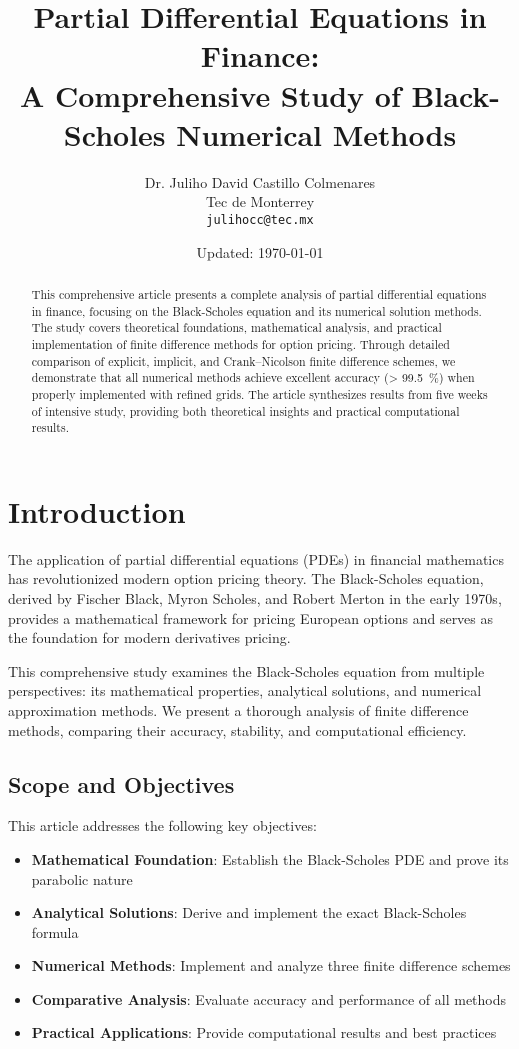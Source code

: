 \documentclass[12pt,a4paper]{article}
\title{\textbf{Partial Differential Equations in Finance: \\
A Comprehensive Study of Black-Scholes Numerical Methods}}
\author{Dr. Juliho David Castillo Colmenares \\ Tec de Monterrey \\ \texttt{julihocc@tec.mx}}
\date{Updated: \today}
\numberwithin{algorithm}{subsection}
\begin{document}
\maketitle

\begin{abstract}
This comprehensive article presents a complete analysis of partial differential equations in finance, focusing on the Black-Scholes equation and its numerical solution methods. The study covers theoretical foundations, mathematical analysis, and practical implementation of finite difference methods for option pricing. Through detailed comparison of explicit, implicit, and Crank–Nicolson finite difference schemes, we demonstrate that all numerical methods achieve excellent accuracy (> \SI{99.5}{\percent}) when properly implemented with refined grids. The article synthesizes results from five weeks of intensive study, providing both theoretical insights and practical computational results.
\end{abstract}

\tableofcontents
\listoffigures
\newpage
\listoftables
\newpage

\section{Introduction}
\label{sec:introduction}

The application of partial differential equations (PDEs) in financial mathematics has revolutionized modern option pricing theory. The Black-Scholes equation, derived by Fischer Black, Myron Scholes, and Robert Merton in the early 1970s, provides a mathematical framework for pricing European options and serves as the foundation for modern derivatives pricing.

This comprehensive study examines the Black-Scholes equation from multiple perspectives: its mathematical properties, analytical solutions, and numerical approximation methods. We present a thorough analysis of finite difference methods, comparing their accuracy, stability, and computational efficiency.

\subsection{Scope and Objectives}

This article addresses the following key objectives:

\begin{itemize}
\item \textbf{Mathematical Foundation}: Establish the Black-Scholes PDE and prove its parabolic nature
\item \textbf{Analytical Solutions}: Derive and implement the exact Black-Scholes formula
\item \textbf{Numerical Methods}: Implement and analyze three finite difference schemes
\item \textbf{Comparative Analysis}: Evaluate accuracy and performance of all methods
\item \textbf{Practical Applications}: Provide computational results and best practices
\end{itemize}
\end{document}
